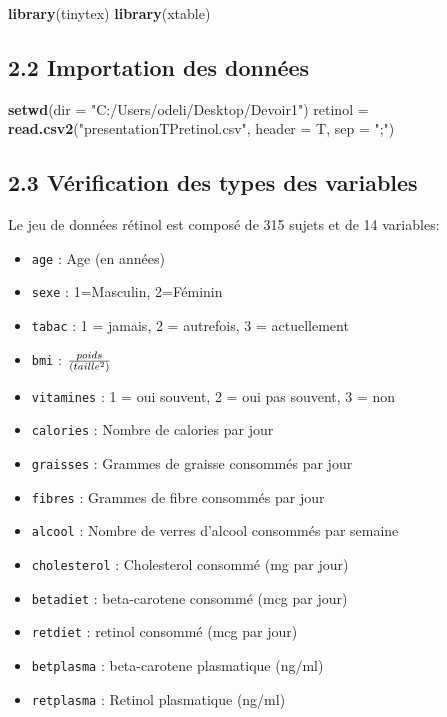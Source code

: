 \documentclass[]{article}
\newenvironment{Shaded}{\begin{snugshade}}{\end{snugshade}}
\newcommand{\KeywordTok}[1]{\textcolor[rgb]{0.13,0.29,0.53}{\textbf{#1}}}
\newcommand{\DataTypeTok}[1]{\textcolor[rgb]{0.13,0.29,0.53}{#1}}
\newcommand{\StringTok}[1]{\textcolor[rgb]{0.31,0.60,0.02}{#1}}
\newcommand{\NormalTok}[1]{#1}
\providecommand{\tightlist}{%
  \setlength{\itemsep}{0pt}\setlength{\parskip}{0pt}}
\begin{document}
\begin{Shaded}
\begin{Highlighting}[]
\KeywordTok{library}\NormalTok{(tinytex)}
\KeywordTok{library}\NormalTok{(xtable)}
\end{Highlighting}
\end{Shaded}

\subsection{2.2 Importation des
données}\label{importation-des-donnuxe9es}

\begin{Shaded}
\begin{Highlighting}[]
\KeywordTok{setwd}\NormalTok{(}\DataTypeTok{dir =} \StringTok{"C:/Users/odeli/Desktop/Devoir1"}\NormalTok{)}
\NormalTok{retinol =}\StringTok{ }\KeywordTok{read.csv2}\NormalTok{(}\StringTok{"presentationTPretinol.csv"}\NormalTok{, }\DataTypeTok{header =}\NormalTok{ T, }\DataTypeTok{sep =} \StringTok{";"}\NormalTok{)}
\end{Highlighting}
\end{Shaded}

\subsection{2.3 Vérification des types des
variables}\label{vuxe9rification-des-types-des-variables}

Le jeu de données rétinol est composé de 315 sujets et de 14 variables:

\begin{itemize}
\tightlist
\item
  \texttt{age} : Age (en années)
\item
  \texttt{sexe} : 1=Masculin, 2=Féminin
\item
  \texttt{tabac} : 1 = jamais, 2 = autrefois, 3 = actuellement
\item
  \texttt{bmi} : \(poids\over{(taille^2)}\)
\item
  \texttt{vitamines} : 1 = oui souvent, 2 = oui pas souvent, 3 = non
\item
  \texttt{calories} : Nombre de calories par jour
\item
  \texttt{graisses} : Grammes de graisse consommés par jour
\item
  \texttt{fibres} : Grammes de fibre consommés par jour
\item
  \texttt{alcool} : Nombre de verres d'alcool consommés par semaine
\item
  \texttt{cholesterol} : Cholesterol consommé (mg par jour)
\item
  \texttt{betadiet} : beta-carotene consommé (mcg par jour)
\item
  \texttt{retdiet} : retinol consommé (mcg par jour)
\item
  \texttt{betplasma} : beta-carotene plasmatique (ng/ml)
\item
  \texttt{retplasma} : Retinol plasmatique (ng/ml)
\end{itemize}
\end{document}
